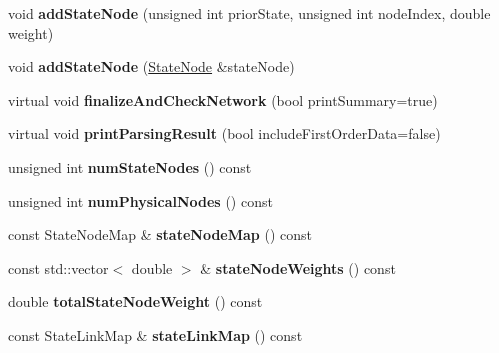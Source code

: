 \begin{DoxyCompactItemize}
\item 
\mbox{\label{classMemNetwork_a7d7f888a1cbc2b99a3e9ceda8095ddde}} 
void {\bfseries add\+State\+Node} (unsigned int prior\+State, unsigned int node\+Index, double weight)
\item 
\mbox{\label{classMemNetwork_a43c7ce8410462fe8575fcfc389473a87}} 
void {\bfseries add\+State\+Node} (\mbox{\hyperlink{structStateNode}{State\+Node}} \&state\+Node)
\item 
\mbox{\label{classMemNetwork_a7efa401263402c00f295bb52b54554d9}} 
virtual void {\bfseries finalize\+And\+Check\+Network} (bool print\+Summary=true)
\item 
\mbox{\label{classMemNetwork_a12246e20e8fc3d36f96526de289dcca5}} 
virtual void {\bfseries print\+Parsing\+Result} (bool include\+First\+Order\+Data=false)
\item 
\mbox{\label{classMemNetwork_a8590241668fab41d6e37a947ad493885}} 
unsigned int {\bfseries num\+State\+Nodes} () const
\item 
\mbox{\label{classMemNetwork_a34ae888dbea67cad6730a1d9fa611823}} 
unsigned int {\bfseries num\+Physical\+Nodes} () const
\item 
\mbox{\label{classMemNetwork_ab15e2122de094a042a8cebc1a0e73b37}} 
const State\+Node\+Map \& {\bfseries state\+Node\+Map} () const
\item 
\mbox{\label{classMemNetwork_a658ae66d196bfff7a3b0db1a3e53e169}} 
const std\+::vector$<$ double $>$ \& {\bfseries state\+Node\+Weights} () const
\item 
\mbox{\label{classMemNetwork_ad8bd42ef05b22797cf723fe2440dcd21}} 
double {\bfseries total\+State\+Node\+Weight} () const
\item 
\mbox{\label{classMemNetwork_a23596299629ff7f9ed2dbd6133387ffd}} 
const State\+Link\+Map \& {\bfseries state\+Link\+Map} () const
\item 
\mbox{\label{classMemNetwork_a07d326d83eb80044df4b6cbd07127aad}} 

\end{DoxyCompactItemize}
